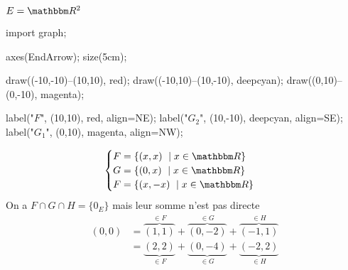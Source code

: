 \begin{exm}
	$E = \R^2$

	\begin{center}
		\begin{asy}
			import graph;

			axes(EndArrow);
			size(5cm);

			draw((-10,-10)--(10,10), red);
			draw((-10,10)--(10,-10), deepcyan);
			draw((0,10)--(0,-10), magenta);
			
			label("$F$", (10,10), red, align=NE);
			label("$G_2$", (10,-10), deepcyan, align=SE);
			label("$G_1$", (0,10), magenta, align=NW);
		\end{asy}
	\end{center}
	\[
		\begin{cases}
			F = \{(x,x)  \mid  x \in \R\} \\
			G = \{(0,x)  \mid  x \in \R\} \\
			F = \{(x,-x)  \mid  x \in \R\} \\
		\end{cases}
	\] 
	On a $F \cap G \cap H = \{0_E\}$ mais leur somme n'est pas directe\\

	\begin{align*}
		(0,0) &= \overbrace{(1,1)}^{\in F} + \overbrace{(0, -2)}^{\in G} + \overbrace{(-1,1)}^{\in H}\\
		&= \underbrace{(2,2)}_{\in F} + \underbrace{(0, -4)}_{\in G} + \underbrace{(-2,2)}_{\in H}\\
	\end{align*}
\end{exm}
